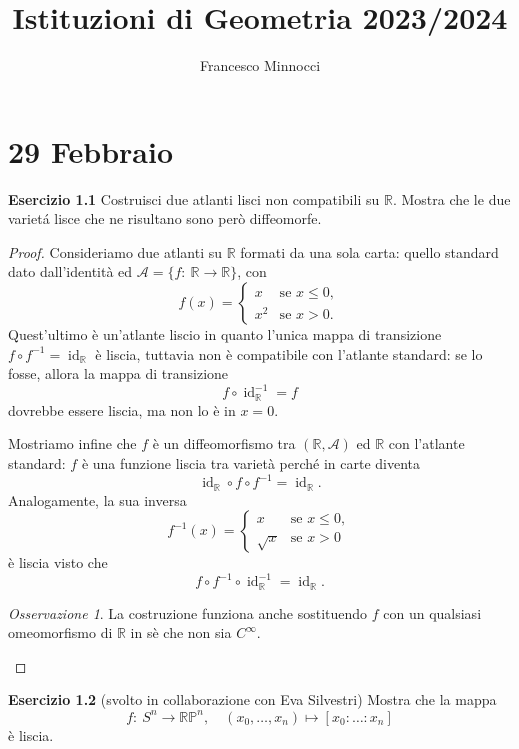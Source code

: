 \documentclass[a4paper]{article}
\title{Istituzioni di Geometria 2023/2024}
\author{Francesco Minnocci}
\newcommand{\R}{\mathbb{R}}
\renewcommand{\P}{\mathbb{P}}
\newcommand{\id}{\operatorname{id}}
\theoremstyle{definition}
\theoremstyle{definition}
\theoremstyle{remark}
\newtheorem*{remark}{Osservazione}
\theoremstyle{definition}
\begin{document}
\maketitle
\section*{29 Febbraio}
\textbf{Esercizio 1.1}
Costruisci due atlanti lisci non compatibili su $\R$. Mostra che le due varietá lisce che ne risultano sono però diffeomorfe.
\begin{proof}
    Consideriamo due atlanti su $\R$ formati da una sola carta: quello standard dato dall'identità ed $\mathcal{A} = \{ f:\: \R\to\R \}$, con
    \[
        f(x) = \begin{cases}
            x   & \text{se } x \leq 0, \\
            x^2 & \text{se } x > 0.
        \end{cases}
    \]
    Quest'ultimo è un'atlante liscio in quanto l'unica mappa di transizione $f \circ f ^{-1} =  \id_{\R}$ è liscia, tuttavia non è compatibile con l'atlante standard: se
    lo fosse, allora la mappa di transizione
    \[
        f \circ \id_{\R}^{-1} = f
    \]
    dovrebbe essere liscia, ma non lo è in $x = 0$.

    Mostriamo infine che $f$ è un diffeomorfismo tra $(\R, \mathcal{A})$ ed $\R$ con l'atlante standard: $f$ è una funzione liscia tra varietà perché in carte diventa
    \[
        \id_{\R} \circ f \circ f^{-1} = \id_{\R}
        .\]
    Analogamente, la sua inversa
    \[
        f^{-1}(x) = \begin{cases}
            x        & \text{se } x \leq 0, \\
            \sqrt{x} & \text{se } x > 0
        \end{cases}
    \]
    è liscia visto che \[
        f \circ f^{-1} \circ \id_{\R}^{-1} = \id_{\R}.
    \]
    \begin{remark}
        La costruzione funziona anche sostituendo $f$ con un qualsiasi omeomorfismo di $\R$ in sè che non sia $C^\infty$.
    \end{remark}
\end{proof}
\textbf{Esercizio 1.2} (svolto in collaborazione con Eva Silvestri)
Mostra che la mappa
\[
    f:\:S^n \to \R\P^n, \quad (x_0, \ldots, x_n) \mapsto [x_0 : \ldots : x_n]
\]
è liscia.
\end{document}
